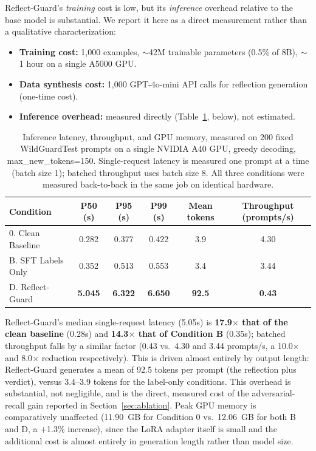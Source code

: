 \documentclass[Superintelligence,article,submit,pdftex,moreauthors]{Definitions/mdpi}
\begin{document}
Reflect-Guard's \emph{training} cost is low, but its \emph{inference} overhead relative to the base model is substantial. We report it here as a direct measurement rather than a qualitative characterization:
\begin{itemize}[leftmargin=*, nosep]
  \item \textbf{Training cost:} 1{,}000 examples, $\sim$42M trainable parameters (0.5\% of 8B), $\sim$1 hour on a single A5000 GPU.
  \item \textbf{Data synthesis cost:} 1{,}000 GPT-4o-mini API calls for reflection generation (one-time cost).
  \item \textbf{Inference overhead:} measured directly (Table~\ref{tab:latency}, below), not estimated.
\end{itemize}

\begin{table}[H]
  \caption{Inference latency, throughput, and GPU memory, measured on 200 fixed WildGuardTest prompts on a single NVIDIA A40 GPU, greedy decoding, max\_new\_tokens=150. Single-request latency is measured one prompt at a time (batch size 1); batched throughput uses batch size 8. All three conditions were measured back-to-back in the same job on identical hardware.\label{tab:latency}}
  \centering
  \small
  \begin{tabular}{lccccc}
    \toprule
    Condition & P50 (s) & P95 (s) & P99 (s) & Mean tokens & Throughput (prompts/s) \\
    \midrule
    0. Clean Baseline & 0.282 & 0.377 & 0.422 & 3.9 & 4.30 \\
    B. SFT Labels Only & 0.352 & 0.513 & 0.553 & 3.4 & 3.44 \\
    D. Reflect-Guard & \textbf{5.045} & \textbf{6.322} & \textbf{6.650} & \textbf{92.5} & \textbf{0.43} \\
    \bottomrule
  \end{tabular}
\end{table}

Reflect-Guard's median single-request latency (5.05s) is \textbf{17.9$\times$ that of the clean baseline} (0.28s) and \textbf{14.3$\times$ that of Condition B} (0.35s); batched throughput falls by a similar factor (0.43 vs.\ 4.30 and 3.44 prompts/s, a 10.0$\times$ and 8.0$\times$ reduction respectively). This is driven almost entirely by output length: Reflect-Guard generates a mean of 92.5 tokens per prompt (the reflection plus verdict), versus 3.4--3.9 tokens for the label-only conditions. This overhead is substantial, not negligible, and is the direct, measured cost of the adversarial-recall gain reported in Section~\ref{sec:ablation}. Peak GPU memory is comparatively unaffected (11.90~GB for Condition 0 vs.\ 12.06~GB for both B and D, a $+$1.3\% increase), since the LoRA adapter itself is small and the additional cost is almost entirely in generation length rather than model size.
\end{document}
